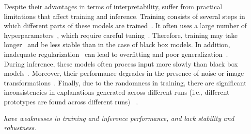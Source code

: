 Despite their advantages in terms of interpretability, \ppms suffer from practical limitations that affect training and inference.
Training consists of several steps in which different parts of these models are trained~\citep{Zhang_2022_ProtGNNSelfExplainingGraph}. It often uses a large number of hyperparameters~\citep{Ruis_2021_IndependentPrototypePropagation}, which require careful tuning~\citep{Rymarczyk_2022_InterpretableImageClassification}. Therefore, training may take longer~\citep{Alpherts2024_facct_perceptive-visual-urban-analytics} and be less stable than in the case of black box models. In addition, inadequate regularization~\citep{Bontempelli_2023_ConceptlevelDebuggingPartPrototype} can lead to overfitting and poor generalization~\citep{Carmichael_2024_ThisProbablyLooks}.
During inference, these models often process input more slowly than black box models~\citep{Fauvel_2023_LightweightEfficientExplainablebyDesign}. Moreover, their performance degrades in the presence of noise or image transformations~\citep{Patricio2024_acm-csur_XAI-medical-image-classification,Nauta2023_wcxai_co-12-for-prototype-models}.
Finally, due to the randomness in training, there are significant inconsistencies in explanations generated across different runs (i.e., different prototypes are found across different runs) ~\citep{Nauta2023_wcxai_co-12-for-prototype-models}.

\textit{\ppms have weaknesses in training and inference performance, and lack stability and robustness.}


